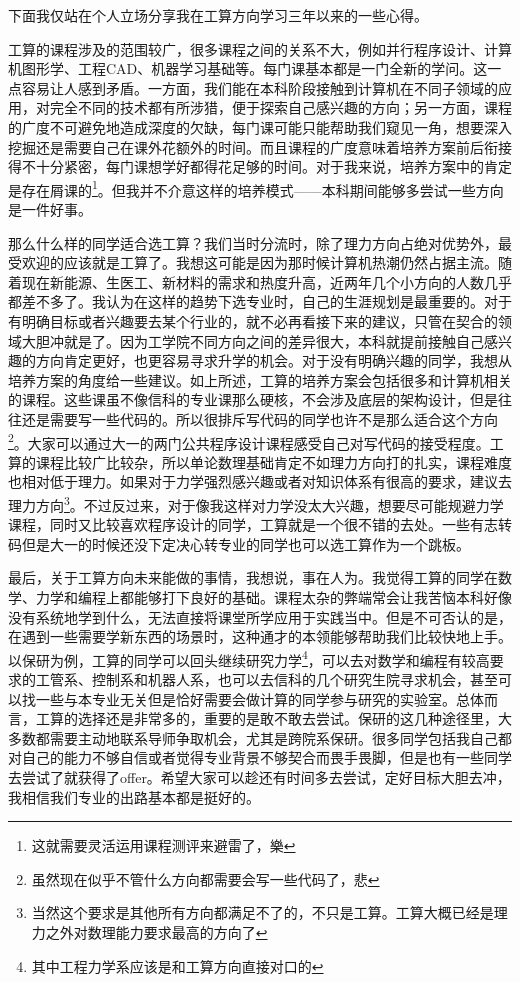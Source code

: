 \documentclass[11pt,oneside]{book}
\begin{document}
\vspace{10pt}

下面我仅站在个人立场分享我在工算方向学习三年以来的一些心得。

\vspace{10pt}

工算的课程涉及的范围较广，很多课程之间的关系不大，例如并行程序设计、计算机图形学、工程CAD、机器学习基础等。每门课基本都是一门全新的学问。这一点容易让人感到矛盾。一方面，我们能在本科阶段接触到计算机在不同子领域的应用，对完全不同的技术都有所涉猎，便于探索自己感兴趣的方向；另一方面，课程的广度不可避免地造成深度的欠缺，每门课可能只能帮助我们窥见一角，想要深入挖掘还是需要自己在课外花额外的时间。而且课程的广度意味着培养方案前后衔接得不十分紧密，每门课想学好都得花足够的时间。对于我来说，培养方案中的肯定是存在屑课的\footnote{这就需要灵活运用课程测评来避雷了，樂}。但我并不介意这样的培养模式——本科期间能够多尝试一些方向是一件好事。

\vspace{10pt}

那么什么样的同学适合选工算？我们当时分流时，除了理力方向占绝对优势外，最受欢迎的应该就是工算了。我想这可能是因为那时候计算机热潮仍然占据主流。随着现在新能源、生医工、新材料的需求和热度升高，近两年几个小方向的人数几乎都差不多了。我认为在这样的趋势下选专业时，自己的生涯规划是最重要的。对于有明确目标或者兴趣要去某个行业的，就不必再看接下来的建议，只管在契合的领域大胆冲就是了。因为工学院不同方向之间的差异很大，本科就提前接触自己感兴趣的方向肯定更好，也更容易寻求升学的机会。对于没有明确兴趣的同学，我想从培养方案的角度给一些建议。如上所述，工算的培养方案会包括很多和计算机相关的课程。这些课虽不像信科的专业课那么硬核，不会涉及底层的架构设计，但是往往还是需要写一些代码的。所以很排斥写代码的同学也许不是那么适合这个方向\footnote{虽然现在似乎不管什么方向都需要会写一些代码了，悲}。大家可以通过大一的两门公共程序设计课程感受自己对写代码的接受程度。工算的课程比较广比较杂，所以单论数理基础肯定不如理力方向打的扎实，课程难度也相对低于理力。如果对于力学强烈感兴趣或者对知识体系有很高的要求，建议去理力方向\footnote{当然这个要求是其他所有方向都满足不了的，不只是工算。工算大概已经是理力之外对数理能力要求最高的方向了}。不过反过来，对于像我这样对力学没太大兴趣，想要尽可能规避力学课程，同时又比较喜欢程序设计的同学，工算就是一个很不错的去处。一些有志转码但是大一的时候还没下定决心转专业的同学也可以选工算作为一个跳板。

\vspace{10pt}

最后，关于工算方向未来能做的事情，我想说，事在人为。我觉得工算的同学在数学、力学和编程上都能够打下良好的基础。课程太杂的弊端常会让我苦恼本科好像没有系统地学到什么，无法直接将课堂所学应用于实践当中。但是不可否认的是，在遇到一些需要学新东西的场景时，这种通才的本领能够帮助我们比较快地上手。以保研为例，工算的同学可以回头继续研究力学\footnote{其中工程力学系应该是和工算方向直接对口的}，可以去对数学和编程有较高要求的工管系、控制系和机器人系，也可以去信科的几个研究生院寻求机会，甚至可以找一些与本专业无关但是恰好需要会做计算的同学参与研究的实验室。总体而言，工算的选择还是非常多的，重要的是敢不敢去尝试。保研的这几种途径里，大多数都需要主动地联系导师争取机会，尤其是跨院系保研。很多同学包括我自己都对自己的能力不够自信或者觉得专业背景不够契合而畏手畏脚，但是也有一些同学去尝试了就获得了offer。希望大家可以趁还有时间多去尝试，定好目标大胆去冲，我相信我们专业的出路基本都是挺好的。
\end{document}
